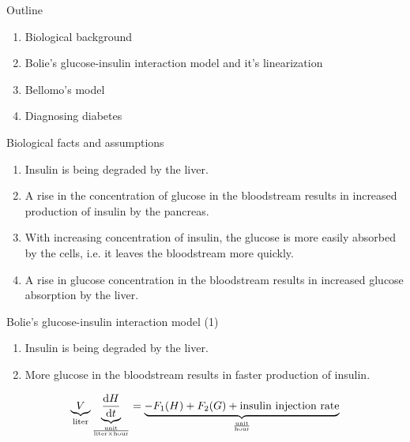 \documentclass{beamer}
\providecommand{\m}[1]{\ensuremath{\mathrm{#1}}}
\begin{document}
\begin{frame}{Outline}
\begin{enumerate}
 \item Biological background
 \item Bolie's glucose-insulin interaction model and it's linearization
 \item Bellomo's model
 \item Diagnosing diabetes
\end{enumerate}


\end{frame}

\begin{frame}{Biological facts and assumptions}
\begin{enumerate}
	\item
	Insulin is being degraded by the liver.	
	\item
	A rise in the concentration of glucose in the bloodstream results in increased production of insulin by the pancreas.
	\item
	With increasing concentration of insulin, the glucose is more easily absorbed by the cells, i.e. it leaves the bloodstream more quickly.
	\item
	A rise in glucose concentration in the bloodstream results in increased glucose absorption by the liver.

\end{enumerate}
\end{frame}

\begin{frame}{Bolie's glucose-insulin interaction model (1)}

\begin{enumerate}
	\item
	Insulin is being degraded by the liver.	
	\item
	More glucose in the bloodstream results in faster production of insulin.
\end{enumerate}

\begin{align*}
\underbrace{V}_%
{\text{liter}}%
%
\underbrace{\frac{\m{d} H}{\m{d} t}}_%
{\frac{\text{unit}}{\text{liter} \times\text{hour}}}
=%
\underbrace{-F_1(H)+F_2(G)+\text{insulin injection rate}}%
_{\frac{\text{unit}}{\text{hour}}}
\end{align*}

\end{frame}
\end{document}
